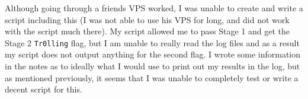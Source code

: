 \documentclass{article}
\newcommand\tab[1][.5cm]{\hspace*{#1}}
\begin{document}
	\tab Although going through a friends VPS worked, I was unable to create and write a script including 
	this (I was not able to use his VPS for long, and did not work with the script much there). My script
	allowed me to pass Stage 1 and get the Stage 2 \texttt{Tr0lling} flag, but I am unable to really read
	the log files and as a result my script does not output anything for the second flag. I wrote some 
	information in the notes as to ideally what I would use to print out my results in the log, but as 
	mentioned previously, it seems that I was unable to completely test or write a decent script for this. 
	
\end{document}
